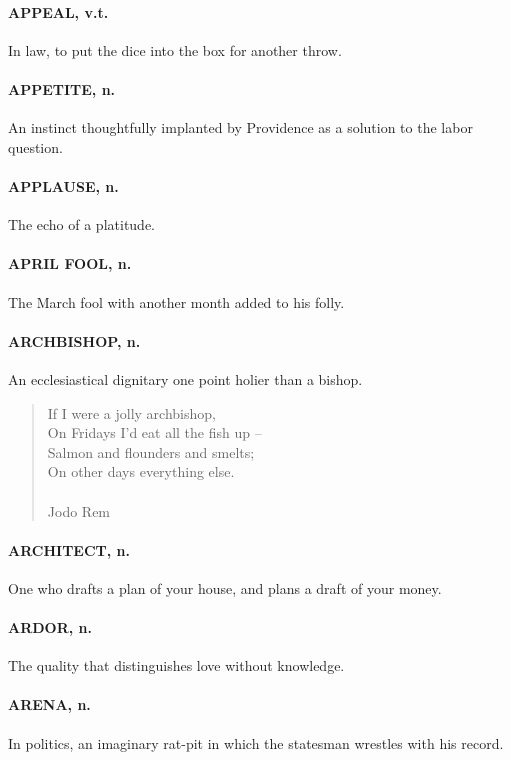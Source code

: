 \documentclass[11pt]{article}
\begin{document}
\paragraph{APPEAL, v.t.}  In law, to put the dice into the box for another throw.

\paragraph{APPETITE, n.}  An instinct thoughtfully implanted by Providence as a
solution to the labor question.

\paragraph{APPLAUSE, n.}  The echo of a platitude.

\paragraph{APRIL FOOL, n.}  The March fool with another month added to his folly.

\paragraph{ARCHBISHOP, n.}  An ecclesiastical dignitary one point holier than a
bishop.

\begin{quote}   If I were a jolly archbishop, \\
  On Fridays I'd eat all the fish up -- \\
  Salmon and flounders and smelts; \\
  On other days everything else. \\
 \\
Jodo Rem \end{quote}


\paragraph{ARCHITECT, n.}  One who drafts a plan of your house, and plans a draft
of your money.

\paragraph{ARDOR, n.}  The quality that distinguishes love without knowledge.

\paragraph{ARENA, n.}  In politics, an imaginary rat-pit in which the statesman
wrestles with his record.
\end{document}
